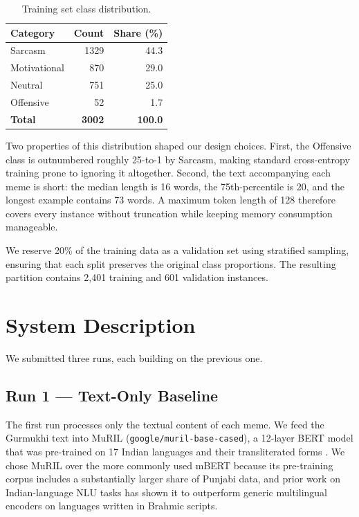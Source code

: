 \documentclass[
]{ceurart}
\begin{document}
\begin{table}[h]
\caption{Training set class distribution.}
\label{tab:dist}
\begin{tabular}{lrr}
\toprule
\textbf{Category} & \textbf{Count} & \textbf{Share (\%)} \\
\midrule
Sarcasm      & 1329 & 44.3 \\
Motivational &  870 & 29.0 \\
Neutral      &  751 & 25.0 \\
Offensive    &   52 &  1.7 \\
\midrule
\textbf{Total} & \textbf{3002} & \textbf{100.0} \\
\bottomrule
\end{tabular}
\end{table}

Two properties of this distribution shaped our design choices. First, the Offensive class is outnumbered roughly 25-to-1 by Sarcasm, making standard cross-entropy training prone to ignoring it altogether. Second, the text accompanying each meme is short: the median length is 16 words, the 75th-percentile is 20, and the longest example contains 73 words. A maximum token length of 128 therefore covers every instance without truncation while keeping memory consumption manageable.

We reserve 20\% of the training data as a validation set using stratified sampling, ensuring that each split preserves the original class proportions. The resulting partition contains 2,401 training and 601 validation instances.

\section{System Description}

We submitted three runs, each building on the previous one.

\subsection{Run 1 --- Text-Only Baseline}

The first run processes only the textual content of each meme. We feed the Gurmukhi text into MuRIL (\texttt{google/muril-base-cased}), a 12-layer BERT model that was pre-trained on 17 Indian languages and their transliterated forms \cite{khanuja2021muril}. We chose MuRIL over the more commonly used mBERT because its pre-training corpus includes a substantially larger share of Punjabi data, and prior work on Indian-language NLU tasks has shown it to outperform generic multilingual encoders on languages written in Brahmic scripts.
\end{document}
